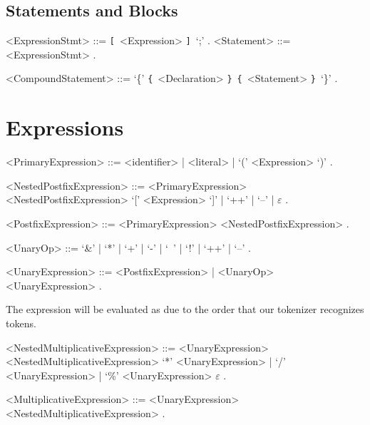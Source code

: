 \documentclass{article}
\def\lrep{\synshortsoff\texttt{\{}\synshorts~}
\def\rrep{\synshortsoff\texttt{\}}\synshorts~}
\def\lopt{\synshortsoff\texttt{[}\synshorts~}
\def\ropt{\synshortsoff\texttt{]}\synshorts~}
\begin{document}
\subsection*{Statements and Blocks}

\begin{grammar}
  <ExpressionStmt> ::= \lopt <Expression> \ropt `;' .
  <Statement> ::= <ExpressionStmt> .
  
  <CompoundStatement> ::= `\{' \lrep <Declaration> \rrep \lrep <Statement>
  \rrep `\}' .
\end{grammar}

\section*{Expressions}

\begin{grammar}
  <PrimaryExpression> ::= <identifier> | <literal> | `(' <Expression> `)' .

  <NestedPostfixExpression> ::= <PrimaryExpression> <NestedPostfixExpression>
  \alt `[' <Expression> `]' | `++' | `--' | $\varepsilon$ .

  <PostfixExpression> ::= <PrimaryExpression> <NestedPostfixExpression> .

  <UnaryOp> ::= `&' | `*' | `+' | `-' | `~' | `!' | `++' | `--' .

  <UnaryExpression> ::= <PostfixExpression> | <UnaryOp> <UnaryExpression> .
\end{grammar}
The expression  will be evaluated as  due to the
order that our tokenizer recognizes tokens.

\begin{grammar}
  <NestedMultiplicativeExpression> ::= <UnaryExpression>
  <NestedMultiplicativeExpression>
  \alt `*' <UnaryExpression> | `/' <UnaryExpression> | `\%' <UnaryExpression>
  \alt $\varepsilon$ .
  
  <MultiplicativeExpression> ::= <UnaryExpression>
  <NestedMultiplicativeExpression> .

\end{grammar}
\end{document}
